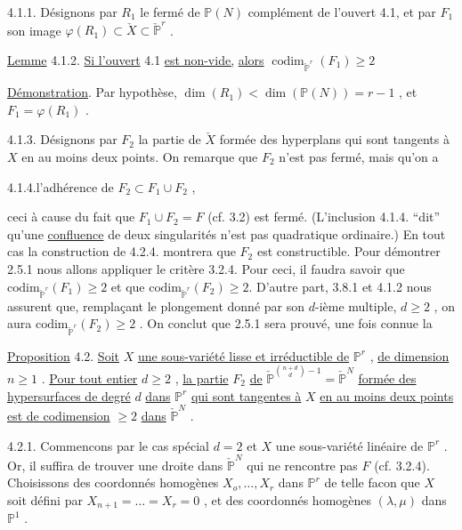 4.1.1. Désignons par $R_1$ le fermé de $\mathbb{P}(N)$ complément de l'ouvert 4.1, et par $F_1$ son image $\varphi(R_1) \subset \check{X} \subset \check{\mathbb{P}}^r$ .

\underline{Lemme} 4.1.2. \underline{Si l'ouvert} 4.1 \underline{est non-vide,} \underline{alors} $\operatorname{codim}_{\check{\mathbb{P}}^r}(F_1) \geqslant 2$

\underline{Démonstration}. Par hypothèse, $\dim(R_1) < \dim(\mathbb{P}(N)) = r-1$ , et $F_1 = \varphi(R_1)$ .

4.1.3. Désignons par $F_2$ la partie de $\check{X}$ formée des hyperplans qui sont tangents à $X$ en au moins deux points. On remarque que $F_2$ n'est
pas fermé, mais qu'on a

4.1.4.\quad l'adhérence de $F_2 \subset F_1 \cup F_2$ ,

ceci à cause du fait que $F_1 \cup F_2 = F$ (cf. 3.2) est fermé. (L'inclusion 4.1.4. ``dit'' qu'une \underline{confluence} de deux singularités n'est pas quadratique ordinaire.) En tout cas la construction de 4.2.4. montrera que $F_2$ est constructible. Pour démontrer 2.5.1 nous allons appliquer le critère 3.2.4. Pour ceci, il faudra savoir que $\mathrm{codim}_{\check{\mathbb{P}}^r}(F_1) \geq 2$ et que $\mathrm{codim}_{\check{\mathbb{P}}^r}(F_2) \geq 2$. D'autre part, 3.8.1 et 4.1.2 nous assurent que, remplaçant le plongement donné par son $d$-ième multiple, $d \geq 2$ , on aura $\mathrm{codim}_{\check{\mathbb{P}}^r}(F_2) \geq 2$ . On conclut que 2.5.1 sera prouvé, une fois connue la

\underline{Proposition} 4.2. \underline{Soit} $X$ \underline{une sous-variété lisse et irréductible de} $\mathbb{P}^r$ , \underline{de dimension} $n \geq 1$ . \underline{Pour tout entier} $d \geq 2$ , \underline{la partie} $F_2$ \underline{de} $\check{\mathbb{P}}^{{n+d \choose d}-1} = \check{\mathbb{P}}^N$ \underline{formée des hypersurfaces de degré} $d$ \underline{dans} $\mathbb{P}^r$ \underline{qui sont tangentes à} $X$ \underline{en au moins deux points est de codimension} $\geq 2$ \underline{dans} $\check{\mathbb{P}}^N$ .

4.2.1. Commencons par le cas spécial $d = 2$ et $X$ une sous-variété linéaire de $\mathbb{P}^r$ . Or, il suffira de trouver une droite dans $\check{\mathbb{P}}^N$ qui ne rencontre pas $F$ (cf. 3.2.4). Choisissons des coordonnés homogènes $X_o,\ldots,X_r$ dans $\mathbb{P}^r$ de telle facon que $X$ soit défini par
$X_{n+1} = \ldots = X_r = 0$ , et des coordonnés homogènes $(\lambda, \mu)$ dans $\mathbb{P}^1$ .

